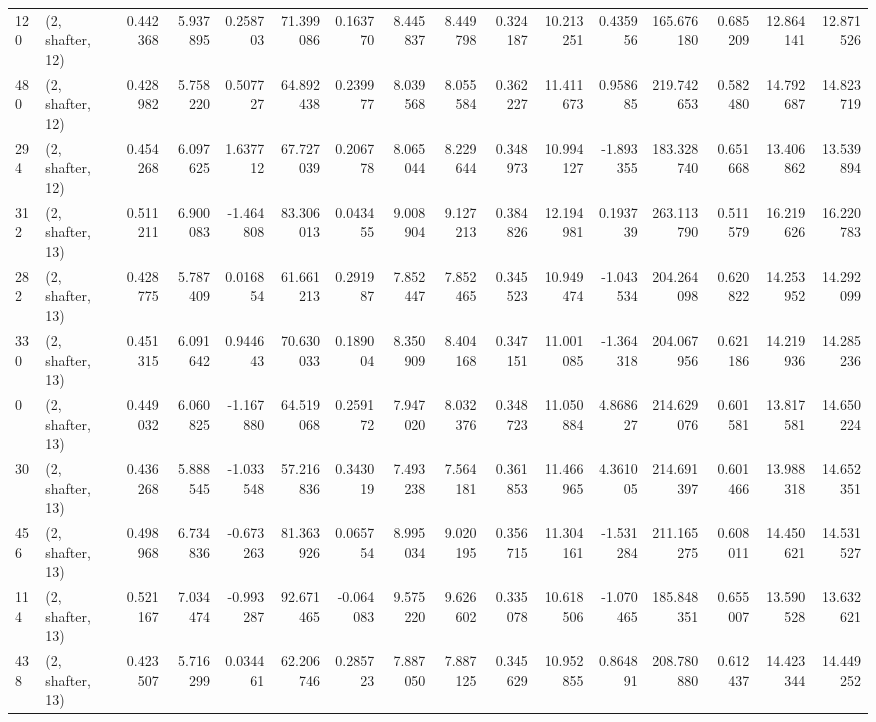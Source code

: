 \begin{tabular}{llrrrrrrrrrrrrrr}
120 &  (2, shafter, 12) &   0.442368 &   5.937895 &   0.258703 &    71.399086 &   0.163770 &   8.445837 &   8.449798 &  0.324187 &  10.213251 &   0.435956 &   165.676180 &  0.685209 &  12.864141 &  12.871526 \\
480 &  (2, shafter, 12) &   0.428982 &   5.758220 &   0.507727 &    64.892438 &   0.239977 &   8.039568 &   8.055584 &  0.362227 &  11.411673 &   0.958685 &   219.742653 &  0.582480 &  14.792687 &  14.823719 \\
294 &  (2, shafter, 12) &   0.454268 &   6.097625 &   1.637712 &    67.727039 &   0.206778 &   8.065044 &   8.229644 &  0.348973 &  10.994127 &  -1.893355 &   183.328740 &  0.651668 &  13.406862 &  13.539894 \\
312 &  (2, shafter, 13) &   0.511211 &   6.900083 &  -1.464808 &    83.306013 &   0.043455 &   9.008904 &   9.127213 &  0.384826 &  12.194981 &   0.193739 &   263.113790 &  0.511579 &  16.219626 &  16.220783 \\
282 &  (2, shafter, 13) &   0.428775 &   5.787409 &   0.016854 &    61.661213 &   0.291987 &   7.852447 &   7.852465 &  0.345523 &  10.949474 &  -1.043534 &   204.264098 &  0.620822 &  14.253952 &  14.292099 \\
330 &  (2, shafter, 13) &   0.451315 &   6.091642 &   0.944643 &    70.630033 &   0.189004 &   8.350909 &   8.404168 &  0.347151 &  11.001085 &  -1.364318 &   204.067956 &  0.621186 &  14.219936 &  14.285236 \\
0   &  (2, shafter, 13) &   0.449032 &   6.060825 &  -1.167880 &    64.519068 &   0.259172 &   7.947020 &   8.032376 &  0.348723 &  11.050884 &   4.868627 &   214.629076 &  0.601581 &  13.817581 &  14.650224 \\
30  &  (2, shafter, 13) &   0.436268 &   5.888545 &  -1.033548 &    57.216836 &   0.343019 &   7.493238 &   7.564181 &  0.361853 &  11.466965 &   4.361005 &   214.691397 &  0.601466 &  13.988318 &  14.652351 \\
456 &  (2, shafter, 13) &   0.498968 &   6.734836 &  -0.673263 &    81.363926 &   0.065754 &   8.995034 &   9.020195 &  0.356715 &  11.304161 &  -1.531284 &   211.165275 &  0.608011 &  14.450621 &  14.531527 \\
114 &  (2, shafter, 13) &   0.521167 &   7.034474 &  -0.993287 &    92.671465 &  -0.064083 &   9.575220 &   9.626602 &  0.335078 &  10.618506 &  -1.070465 &   185.848351 &  0.655007 &  13.590528 &  13.632621 \\
438 &  (2, shafter, 13) &   0.423507 &   5.716299 &   0.034461 &    62.206746 &   0.285723 &   7.887050 &   7.887125 &  0.345629 &  10.952855 &   0.864891 &   208.780880 &  0.612437 &  14.423344 &  14.449252 \\

\end{tabular}
